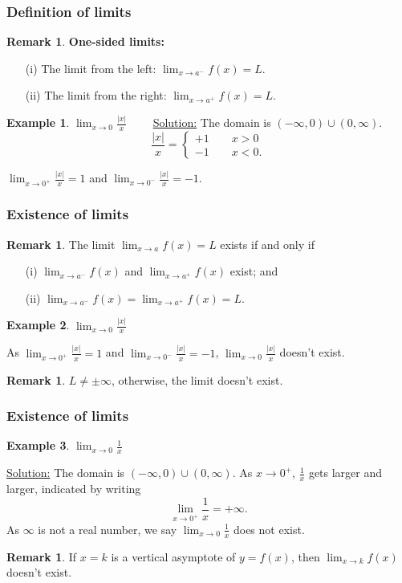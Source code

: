 \documentclass[t]{beamer}
\theoremstyle{plain}
\theoremstyle{definition}
\newtheorem{rem}[prop]{Remark}
\newtheorem{ex}{Example}[section]
\newcommand{\nin}{\noindent}
\newcommand{\disp}{\displaystyle}
\begin{document}
\frame
{
	\frametitle{Definition of  limits}
	\begin{rem}
	{\bf One-sided limits:}

\begin{enumerate}  \item[(i)] The limit from the left:  $\disp{\lim_{x\to a^-}} f(x) =L$.
\item[(ii)] The limit from the right:  $\disp{\lim_{x\to a^+}} f(x) = L$.
\end{enumerate}
\end{rem}
\pause
\begin{ex}
$\disp{\lim_{x\to 0}} \disp{\frac{|x|}{x}}\qquad$ \underline{Solution:} The domain is $(-\infty, 0)\cup (0, \infty)$.\vspace*{-4mm}\pause
\[
\disp{\frac{|x|}{x}} = \left\{ \begin{array}{l}
+1 \qquad x>0\\[2mm]
-1 \qquad x<0.
\end{array}\right.
\]\vspace{-4mm}\pause

$\disp{\lim_{x\to 0^+}  \frac{|x|}{x}} =1$ \pause and $\disp{\lim_{x\to 0^-}  \frac{|x|}{x}} =-1$.
\end{ex}
}
\frame
{
	\frametitle{Existence of  limits}
	\begin{rem}
	The limit $\disp{\lim_{x\to a} f(x) }= L$ exists if and only if
\begin{enumerate}
\item[(i)] $\disp{\lim_{x\to a^-}} f(x)$ and $\disp{\lim_{x\to a^+}} f(x)$ exist; and \pause
\item[(ii)] $\disp{\lim_{x\to a^-}} f(x) = \disp{\lim_{x\to a^+}  f(x)}= L$.
\end{enumerate}
\end{rem}\pause

\begin{ex}
$\disp{\lim_{x\to 0}} \disp{\frac{|x|}{x}}$\pause

\nin
As $\disp{\lim_{x\to 0^+}  \frac{|x|}{x}} =1$ and $\disp{\lim_{x\to 0^-}  \frac{|x|}{x}} =-1$,
$\disp{\lim_{x\to 0}  \frac{|x|}{x}}$ doesn't exist.
\end{ex}\pause
\begin{rem}  $L\neq \pm \infty$, otherwise, the limit doesn't exist. \end{rem}
}
\frame
{
	\frametitle{Existence of  limits}
\begin{ex}
$\disp{\lim_{x\to 0}\frac{1}{x}}$\pause

\nin\underline{Solution:} The domain is $(-\infty, 0)\cup (0, \infty)$. As $x\to 0^+$, $\disp{\frac 1x}$
gets larger and larger, indicated by writing
\[
\lim_{x\to 0^+} \disp{\frac 1x}  = +\infty.
\]
As $\infty$ is not a real number, we say $\disp{\lim_{x\to 0} \frac 1x} $ does not exist.
\end{ex}\pause
\begin{rem}If $x=k$ is a vertical asymptote of $y=f(x)$, then $\disp{\lim_{x\to k}} f(x)$
doesn't exist.\end{rem}
}
\end{document}
